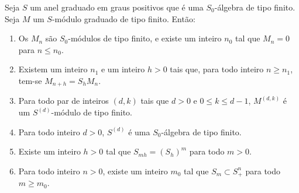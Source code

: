 \documentclass[oneside,10pt]{amsart}
\renewcommand{\leq}{\leqslant}
\renewcommand{\geq}{\geqslant}
\let\EGAOriginalLabel\label
\renewcommand{\label}[1]{\phantomsection\EGAOriginalLabel{#1}}
\begin{document}
\begin{lemma}[2.1.6]
\label{II.2.1.6}
Seja $S$ um anel graduado em graus positivos que é uma $S_0$-álgebra de tipo finito.
Seja $M$ um $S$-módulo graduado de tipo finito.
Então:
\begin{enumerate}
  \item[{\rm(i)}] Os $M_n$ são $S_0$-módulos de tipo finito, e existe um inteiro $n_0$ tal que $M_n=0$ para $n\leq n_0$.
  \item[{\rm(ii)}] Existem um inteiro $n_1$ e um inteiro $h>0$ tais que, para todo inteiro $n\geq n_1$, tem-se $M_{n+h}=S_hM_n$.
  \item[{\rm(iii)}] Para todo par de inteiros $(d,k)$ tais que $d>0$ e $0\leq k\leq d-1$, $M^{(d,k)}$ é um $S^{(d)}$-módulo de tipo finito.
  \item[{\rm(iv)}] Para todo inteiro $d>0$, $S^{(d)}$ é uma $S_0$-álgebra de tipo finito.
  \item[{\rm(v)}] Existe um inteiro $h>0$ tal que $S_{mh}=(S_h)^m$ para todo $m>0$.
  \item[{\rm(vi)}] Para todo inteiro $n>0$, existe um inteiro $m_0$ tal que $S_m\subset S_+^n$ para todo $m\geq m_0$.
\end{enumerate}
\end{lemma}
\end{document}
